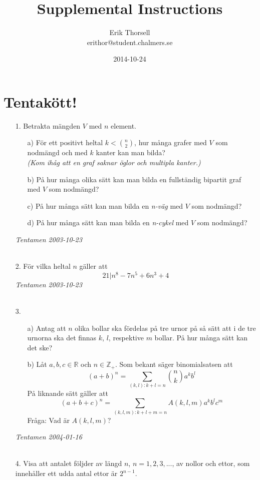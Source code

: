 \documentclass{article}
\title{Supplemental Instructions}
\author{Erik Thorsell \\ 
		\small{erithor@student.chalmers.se}
}
\date{2014-10-24}
\begin{document}
\maketitle

\section*{Tentakött!}

\begin{enumerate}

\item[1.]
Betrakta mängden $V$ med $n$ element.
\begin{itemize}
    \item[a)] För ett positivt heltal $k < \binom{n}{2}$, hur många grafer med 
              $V$ som nodmängd och med $k$ kanter kan man bilda?\\
              {\it (Kom ihåg att en graf saknar öglor och multipla kanter.)}
    \item[b)] På hur många olika sätt kan man bilda en fullständig bipartit 
              graf med $V$ som nodmängd?
    \item[c)] På hur många sätt kan man bilda en {\it n-väg} med $V$ som 
              nodmängd?
    \item[d)] På hur många sätt kan man bilda en {\it n-cykel} med $V$ som 
              nodmängd?
\end{itemize}
{\it Tentamen 2003-10-23}\\
\\
\item[2.]
    För vilka heltal $n$ gäller att $$21|n^8 - 7n^5 + 6n^3 + 4$$
{\it Tentamen 2003-10-23}\\
\\
\item[3.]
\begin{itemize}
    \item[a)] Antag att $n$ olika bollar ska fördelas på tre urnor på så sätt 
              att i de tre urnorna ska det finnas $k$, $l$, respektive $m$ 
              bollar. På hur många sätt kan det ske?
    \item[b)] Låt $a,b,c \in \mathbb{R}$ och $n \in \mathbb{Z}_{+}$. Som 
              bekant säger binomialsatsen att $$(a+b)^n = \sum_{(k,l):k+l=n} 
              \binom{n}{k}a^kb^l$$
              På liknande sätt gäller att $$(a+b+c)^n = \sum_{(k,l,m):k+l+m=n} 
              A(k,l,m)a^kb^lc^m$$
              Fråga: Vad är $A(k,l,m)?$\\
\end{itemize}
{\it Tentamen 2004-01-16}\\
\\
\item[4.]
    Visa att antalet följder av längd $n$, $n=1,2,3,...$, av nollor och ettor, 
    som innehåller ett udda antal ettor är $2^{n-1}$.


\end{enumerate}
\end{document}
